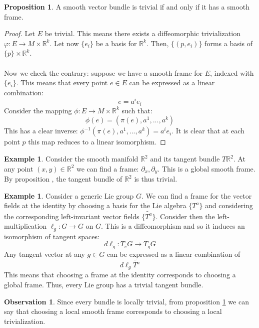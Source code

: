 \documentclass[12pt,a4paper]{report}
\theoremstyle{definition}
\theoremstyle{Theorem}
\newtheorem{Prop}[Def]{Proposition}
\theoremstyle{definition}
\newtheorem{Ex}[Def]{Example}
\theoremstyle{definition}
\newtheorem{Obs}[Def]{Observation}
\begin{document}
	\begin{Prop}\label{Prop_2.3.1}
		A smooth vector bundle is trivial if and only if it has a smooth frame.
	\end{Prop}
	\begin{proof}
		Let $E$ be trivial. This means there exists a diffeomorphic trivialization $\varphi:E\rightarrow M\times \mathbb{R}^k$. Let now $\{e_i\}$ be a basis for $\mathbb{R}^k$. Then, $\{(p,e_i)\}$ forms a basis of $\{p\}\times \mathbb{R}^k$.
		\\\\
		Now we check the contrary: suppose we have a smooth frame for $E$, indexed with $\{e_i\}$. This means that every point $e\in E$ can be expressed as a linear combination:
		$$e=a^ie_i$$
		Consider the mapping $\phi:E\rightarrow M\times\mathbb{R}^k$ such that:
		$$\phi(e)=(\pi(e),a^1,...,a^k)$$
		This has a clear inverse: $\phi^{-1}(\pi(e),a^1,...,a^k)=a^ie_i$.
		It is clear that at each point $p$ this map reduces to a linear isomorphism.
	\end{proof}
	\begin{Ex}
		Consider the smooth manifold $\mathbb{R}^2$ and its tangent bundle $T\mathbb{R}^2$. At any point $(x,y)\in\mathbb{R}^2$ we can find a frame: $\partial_x,\partial_y$. This is a global smooth frame. By proposition $\label{prop_2.3.1}$, the tangent bundle of $\mathbb{R}^2$ is thus trivial.
	\end{Ex}
	\begin{Ex}
		Consider a generic Lie group $G$. We can find a frame for the vector fields at the identity by choosing a basis for the Lie algebra $\{T^a\}$ and considering the corresponding left-invariant vector fields $\{\tilde{T^a}\}$. Consider then the left-multiplication $\ell_g:G\rightarrow G$ on $G$. This is a diffeomorphism and so it induces an isomorphism of tangent spaces:
		$$d\ell_g:T_eG\rightarrow T_gG$$
		Any tangent vector at any $g\in G$ can be expressed as a linear combination of
		$$d\ell_g\tilde{T^a}$$
		This means that choosing a frame at the identity corresponds to choosing a global frame. Thus, every Lie group has a trivial tangent bundle. 
	\end{Ex}
	\begin{Obs}
		Since every bundle is locally trivial, from proposition \ref{Prop_2.3.1} we can say that choosing a local smooth frame corresponds to choosing a local trivialization.
	\end{Obs}
\end{document}
